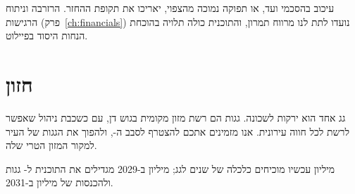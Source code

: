 \begin{riskbox}
עיכוב בהסכמי ועד, או תפוקה נמוכה מהצפוי, יאריכו את תקופת ההחזר. הרזרבה וניתוח הרגישות (פרק~\ref{ch:financials}) נועדו לתת לנו מרווח תמרון, והתוכנית כולה תלויה בהוכחת הנחות היסוד בפיילוט.
\end{riskbox}

\section{חזון}
גג אחד הוא ירקות לשכונה. \RRroofsFinal{} גגות הם רשת מזון מקומית בגוש דן, עם  כשכבת ניהול שאפשר לרשת לכל חווה עירונית. אנו מזמינים אתכם להצטרף לסבב ה-, ולהפוך את הגגות של העיר למקור המזון הטרי שלה.

\begin{insightbox}[סיכום]
\RRseed{} מיליון \shekel{} עכשיו מוכיחים כלכלה של \RRroofPayback{} שנים לגג; \RRseriesA{} מיליון \shekel{} ב-2029 מגדילים את התוכנית ל-\RRroofsFinal{} גגות ולהכנסות של \RRrevFinal{} מיליון \shekel{} ב-2031.
\end{insightbox}
